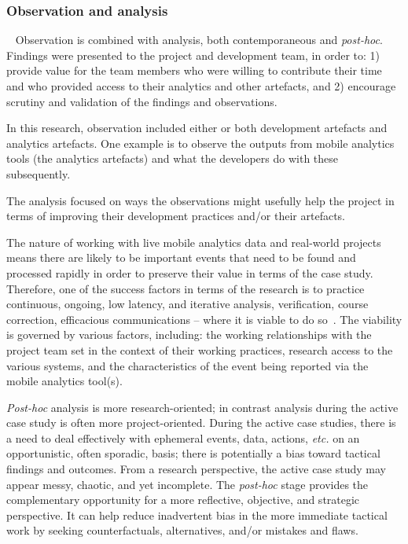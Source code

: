\subsubsection{Observation and analysis}~\label{section-observation-research-method}
Observation is combined with analysis, both contemporaneous and \emph{post-hoc}.   Findings were presented to the project and development team, in order to: 1) provide value for the team members who were willing to contribute their time and who provided access to their analytics and other artefacts, and 2) encourage scrutiny and validation of the findings and observations.

In this research, observation included either or both development artefacts and analytics artefacts. One example is to observe the outputs from mobile analytics tools (the analytics artefacts) and what the developers do with these subsequently. 

The analysis focused on ways the observations might usefully help the project in terms of improving their development practices and/or their artefacts.

The nature of working with live mobile analytics data and real-world projects means there are likely to be important events that need to be found and processed rapidly in order to preserve their value in terms of the case study. Therefore, one of the success factors in terms of the research is to practice continuous, ongoing, low latency, and iterative analysis, verification, course correction, efficacious communications -- where it is viable to do so~. The viability is governed by various factors, including: the working relationships with the project team set in the context of their working practices, research access to the various systems, and the characteristics of the event being reported via the mobile analytics tool(s). 

\emph{Post-hoc} analysis is more research-oriented; in contrast analysis during the active case study is often more project-oriented. During the active case studies, there is a need to deal effectively with ephemeral events, data, actions, \textit{etc.} on an opportunistic, often sporadic, basis; there is potentially a bias toward tactical findings and outcomes. From a research perspective, the active case study may appear messy, chaotic, and yet incomplete. The \textit{post-hoc} stage provides the complementary opportunity for a more reflective, objective, and strategic perspective. It can help reduce inadvertent bias in the more immediate tactical work by seeking counterfactuals, alternatives, and/or mistakes and flaws.

